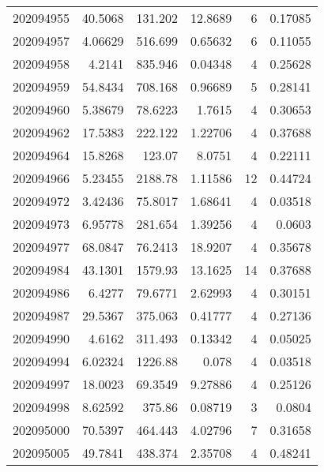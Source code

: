 \begin{tabular}{rrrrrr}
 202094955 &         40.5068  &      131.202  &           12.8689  &           6 & 0.17085 \\
 202094957 &          4.06629 &      516.699  &            0.65632 &           6 & 0.11055 \\
 202094958 &          4.2141  &      835.946  &            0.04348 &           4 & 0.25628 \\
 202094959 &         54.8434  &      708.168  &            0.96689 &           5 & 0.28141 \\
 202094960 &          5.38679 &       78.6223 &            1.7615  &           4 & 0.30653 \\
 202094962 &         17.5383  &      222.122  &            1.22706 &           4 & 0.37688 \\
 202094964 &         15.8268  &      123.07   &            8.0751  &           4 & 0.22111 \\
 202094966 &          5.23455 &     2188.78   &            1.11586 &          12 & 0.44724 \\
 202094972 &          3.42436 &       75.8017 &            1.68641 &           4 & 0.03518 \\
 202094973 &          6.95778 &      281.654  &            1.39256 &           4 & 0.0603  \\
 202094977 &         68.0847  &       76.2413 &           18.9207  &           4 & 0.35678 \\
 202094984 &         43.1301  &     1579.93   &           13.1625  &          14 & 0.37688 \\
 202094986 &          6.4277  &       79.6771 &            2.62993 &           4 & 0.30151 \\
 202094987 &         29.5367  &      375.063  &            0.41777 &           4 & 0.27136 \\
 202094990 &          4.6162  &      311.493  &            0.13342 &           4 & 0.05025 \\
 202094994 &          6.02324 &     1226.88   &            0.078   &           4 & 0.03518 \\
 202094997 &         18.0023  &       69.3549 &            9.27886 &           4 & 0.25126 \\
 202094998 &          8.62592 &      375.86   &            0.08719 &           3 & 0.0804  \\
 202095000 &         70.5397  &      464.443  &            4.02796 &           7 & 0.31658 \\
 202095005 &         49.7841  &      438.374  &            2.35708 &           4 & 0.48241 \\

\end{tabular}
